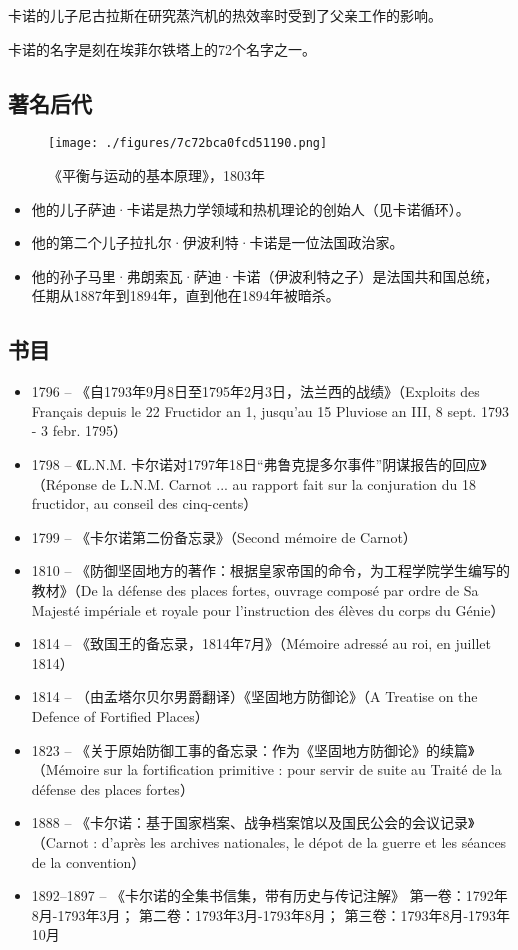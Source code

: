 卡诺的儿子尼古拉斯在研究蒸汽机的热效率时受到了父亲工作的影响。

卡诺的名字是刻在埃菲尔铁塔上的72个名字之一。
\subsection{著名后代}
\begin{figure}[ht]
\centering
\texttt{[image: ./figures/7c72bca0fcd51190.png]}
\caption{《平衡与运动的基本原理》，1803年} \label{fig_Lazare_7}
\end{figure}
\begin{itemize}
\item 他的儿子萨迪·卡诺是热力学领域和热机理论的创始人（见卡诺循环）。  
\item 他的第二个儿子拉扎尔·伊波利特·卡诺是一位法国政治家。  
\item 他的孙子马里·弗朗索瓦·萨迪·卡诺（伊波利特之子）是法国共和国总统，任期从1887年到1894年，直到他在1894年被暗杀。
\end{itemize}
\subsection{书目}  
\begin{itemize}
\item 1796 – 《自1793年9月8日至1795年2月3日，法兰西的战绩》（Exploits des Français depuis le 22 Fructidor an 1, jusqu'au 15 Pluviose an III, 8 sept. 1793 - 3 febr. 1795）  
\item 1798 – 《L.N.M. 卡尔诺对1797年18日“弗鲁克提多尔事件”阴谋报告的回应》（Réponse de L.N.M. Carnot ... au rapport fait sur la conjuration du 18 fructidor, au conseil des cinq-cents）  
\item 1799 – 《卡尔诺第二份备忘录》（Second mémoire de Carnot）  
\item 1810 – 《防御坚固地方的著作：根据皇家帝国的命令，为工程学院学生编写的教材》（De la défense des places fortes, ouvrage composé par ordre de Sa Majesté impériale et royale pour l'instruction des élèves du corps du Génie）  
\item 1814 – 《致国王的备忘录，1814年7月》（Mémoire adressé au roi, en juillet 1814）  
\item 1814 – （由孟塔尔贝尔男爵翻译）《坚固地方防御论》（A Treatise on the Defence of Fortified Places）  
\item 1823 – 《关于原始防御工事的备忘录：作为《坚固地方防御论》的续篇》（Mémoire sur la fortification primitive : pour servir de suite au Traité de la défense des places fortes）  
\item 1888 – 《卡尔诺：基于国家档案、战争档案馆以及国民公会的会议记录》（Carnot : d'après les archives nationales, le dépot de la guerre et les séances de la convention）  
\item 1892–1897 – 《卡尔诺的全集书信集，带有历史与传记注解》  
第一卷：1792年8月-1793年3月；  
第二卷：1793年3月-1793年8月；  
第三卷：1793年8月-1793年10月
\end{itemize}
